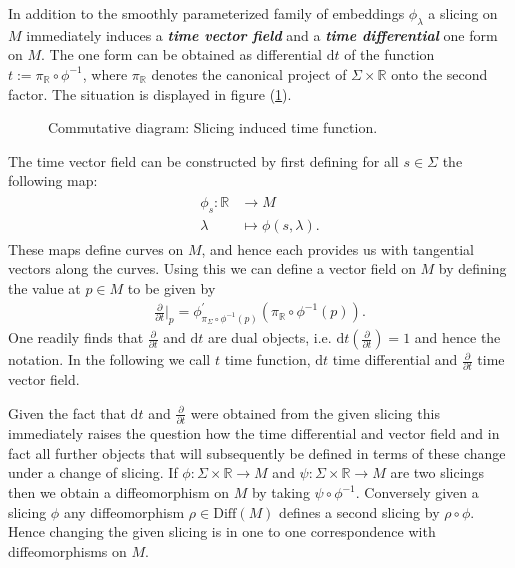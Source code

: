 \documentclass[a4paper,12pt, DIV=14, BCOR=5mm, twoside, headsepline, numbers=noenddot]{scrbook}
\begin{document}
In addition to the smoothly parameterized family of embeddings $\phi_{\lambda}$ a slicing on $M$ immediately induces a \textit{\textbf{time vector field}} and a \textit{\textbf{time differential}} one form on $M$. The one form can be obtained as differential $\mathrm{d}t$ of the function $t:=\pi_{\mathbb{R}} \circ \phi^{-1}$, where $\pi_{\mathbb{R}}$ denotes the canonical project of $\Sigma \times \mathbb{R}$ onto the second factor. The situation is displayed in figure (\ref{DiagrTime}).
\begin{figure}[hbt!]
\centering
{} 
\caption{Commutative diagram: Slicing induced time function.}\label{DiagrTime}
\end{figure}
The time vector field can be constructed by first defining for all $s \in \Sigma$ the following map: 
\begin{align}
\begin{aligned}
    \phi_s : \mathbb{R} &\longrightarrow M \\
    \lambda &\longmapsto \phi(s,\lambda).
\end{aligned}
\end{align}
These maps define curves on $M$, and hence each provides us with tangential vectors along the curves. Using this we can define a vector field on $M$ by defining the value at $p \in M$ to be given by
\begin{align}
\frac{\partial}{\partial t}\bigg \vert_p = \phi^{\prime}_{\pi_{\Sigma}\circ \phi^{-1}(p)} \left (\pi_{\mathbb{R}}\circ \phi^{-1}(p)\right ).
\end{align}
One readily finds that $\frac{\partial}{\partial t}$ and $\mathrm{d}t$ are dual objects, i.e. $\mathrm{d}t(\frac{\partial}{\partial t}) = 1$ and hence the notation. In the following we call $t$ time function, $\mathrm{d}t$ time differential and $\frac{\partial}{\partial t}$ time vector field.

Given the fact that $\mathrm{d}t$ and $\frac{\partial}{\partial t}$ were obtained from the given slicing this immediately raises the question how the time differential and vector field and in fact all further objects that will subsequently be defined in terms of these change under a change of slicing. If $\phi : \Sigma \times \mathbb{R} \rightarrow M $ and $\psi : \Sigma \times \mathbb{R} \rightarrow M$ are two slicings then we obtain a diffeomorphism on $M$ by taking $\psi \circ \phi^{-1}$. Conversely given a slicing $\phi$ any diffeomorphism $\rho \in \mathrm{Diff}(M)$ defines a second slicing by $\rho \circ \phi $. Hence changing the given slicing is in one to one correspondence with diffeomorphisms on $M$. 
\end{document}

